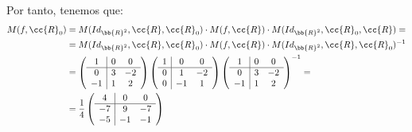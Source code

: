 \begin{ejercicio}
    Por tanto, tenemos que:
    \begin{equation*}
    \begin{split}
        M(f,\cc{R}_0)&=M(Id_{\bb{R}^2},\cc{R},\cc{R}_0)\cdot M(f,\cc{R}) \cdot M(Id_{\bb{R}^2},\cc{R}_0,\cc{R})
        =\\&=M(Id_{\bb{R}^2},\cc{R},\cc{R}_0)\cdot M(f,\cc{R}) \cdot M(Id_{\bb{R}^2},\cc{R},\cc{R}_0)^{-1}\\&
        = \left(
        \begin{array}{c|cc}
            1 & 0 & 0 \\ \hline
            0 & 3 & -2\\
            -1 & 1 & 2
        \end{array}
        \right)
        \left(\begin{array}{c|cc}
            1 & 0 & 0 \\ \hline
            0 & 1 & -2 \\
            0 & -1 & 1
        \end{array}\right)
        \left(
        \begin{array}{c|cc}
            1 & 0 & 0 \\ \hline
            0 & 3 & -2\\
            -1 & 1 & 2
        \end{array}
        \right)^{-1} =\\&=
        \frac{1}{4}\left(
        \begin{array}{c|cc}
            4 & 0 & 0 \\ \hline
            -7 & 9 & -7\\
            -5 & -1 & -1
        \end{array}
        \right)
    \end{split}
    \end{equation*}
\end{ejercicio}

